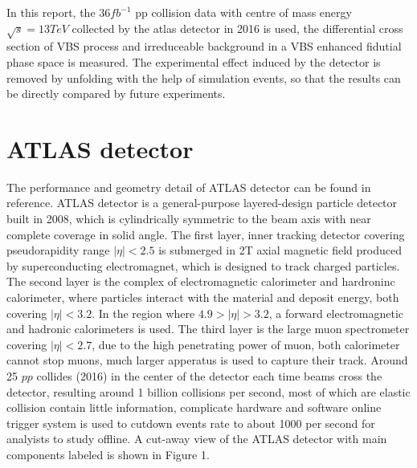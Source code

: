 \documentclass[12pt]{article}
\begin{document}
        \par In this report, the $36 fb^{-1}$ pp collision data with centre of mass energy $\sqrt{s} = 13 TeV$ collected by the atlas detector 
        in 2016 is used, the differential cross section of VBS process and irreduceable background in a VBS enhanced fidutial phase space is measured.
        The experimental effect induced by the detector is removed by unfolding with the help of simulation events, so that the results can be directly 
        compared by future \nopagebreak experiments.

    \section{ATLAS detector}
        \par The performance and geometry detail of ATLAS detector can be found in reference\cite{Collaboration_2008}.
        ATLAS detector is a general-purpose layered-design particle detector built in 2008, which is cylindrically symmetric to the beam axis with near complete coverage in solid angle.
        The first layer, inner tracking detector covering pseudorapidity range $|\eta| < 2.5$ is submerged in 2T axial magnetic field produced by superconducting electromagnet, which is designed to track charged particles. 
        The second layer is the complex of electromagnetic calorimeter and hardroninc calorimeter, where particles interact with the material and deposit energy, both covering $|\eta| < 3.2$. In the region where $4.9> |\eta| > 3.2$, 
        a forward electromagnetic and hadronic calorimeters is used.
        The third layer is the large muon spectrometer covering $|\eta| < 2.7$, due to the high penetrating power of muon, both calorimeter cannot 
        stop muons, much larger apperatus is used to capture their track.
        Around 25 $pp$ collides (2016) in the center of the detector each time beams cross the detector, 
        resulting around 1 billion collisions per second, most of which are elastic collision contain little information, 
        complicate hardware and software online trigger system\cite{Nedden_2017} is 
        used to cutdown events rate to about 1000 per second for analyists to study offline. 
        A cut-away view of the ATLAS detector with main components labeled is shown in Figure 1\cite{Collaboration_2008}.
\end{document}
